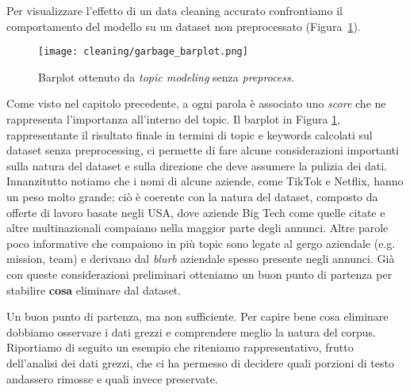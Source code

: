 Per visualizzare l'effetto di un data cleaning accurato confrontiamo il comportamento del modello su un dataset non preprocessato (Figura~\ref{fig:garbage-barplot}).

\begin{figure}[H]
    \centering
    \texttt{[image: cleaning/garbage\_barplot.png]}
    \caption{Barplot ottenuto da \textit{topic modeling} senza \textit{preprocess}.}
    \label{fig:garbage-barplot}
\end{figure}

Come visto nel capitolo precedente, a ogni parola è associato uno \textit{score} che ne rappresenta l'importanza all'interno del topic. Il barplot in Figura \ref{fig:garbage-barplot}, rappresentante il risultato finale in termini di topic e keywords calcolati sul dataset senza preprocessing, ci permette di fare alcune considerazioni importanti sulla natura del dataset e sulla direzione che deve assumere la pulizia dei dati. Innanzitutto notiamo che i nomi di alcune aziende, come TikTok e Netflix, hanno un peso molto grande; ciò è coerente con la natura del dataset, composto da offerte di lavoro basate negli USA, dove aziende Big Tech come quelle citate e altre multinazionali compaiano nella maggior parte degli annunci. Altre parole poco informative che compaiono in più topic sono legate al gergo aziendale (e.g. mission, team) e derivano dal \textit{blurb} aziendale spesso presente negli annunci. Già con queste considerazioni preliminari otteniamo un buon punto di partenza per stabilire \textbf{cosa} eliminare dal dataset.

Un buon punto di partenza, ma non sufficiente. Per capire bene cosa eliminare dobbiamo osservare i dati grezzi e comprendere meglio la natura del corpus. Riportiamo di seguito un esempio che riteniamo rappresentativo, frutto dell'analisi dei dati grezzi, che ci ha permesso di decidere quali porzioni di testo andassero rimosse e quali invece preservate.

